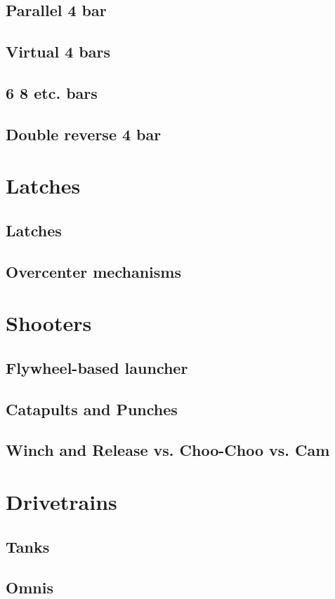 \documentclass[10pt,letterpaper]{book}
\begin{document}
\subsection{Parallel 4 bar}
\subsection{Virtual 4 bars}
\subsection{6 8 etc. bars}
\subsection{Double reverse 4 bar}

\section{Latches}
\subsection{Latches}
\subsection{Overcenter mechanisms}

\section{Shooters}
\subsection{Flywheel-based launcher}
\subsection{Catapults and Punches}
\subsection{Winch and Release vs. Choo-Choo vs. Cam}

\section{Drivetrains}
\subsection{Tanks}
\subsection{Omnis}
\end{document}
